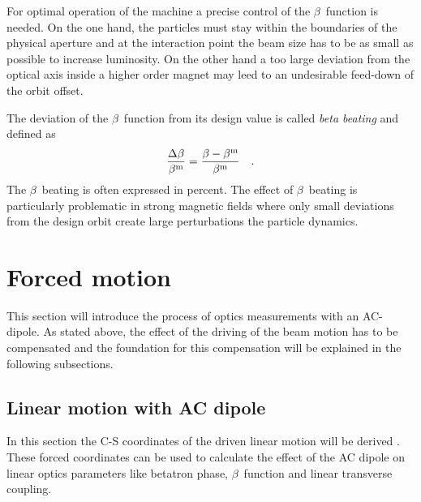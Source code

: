 For optimal operation of the machine a precise control of the $\beta$~function is needed. On the one
hand, the particles must stay within the boundaries of the physical aperture and 
at the interaction point the beam size has to be as small as possible to increase luminosity.
On the other hand a too large deviation from the optical axis inside a higher order magnet may leed to an undesirable
feed-down of the orbit offset.

The deviation of the $\beta$~function from its design value is called \emph{beta beating} and defined as 
%
\begin{equation}
    \frac{\Delta\beta}{\beta^\text{m}} = \frac{\beta - \beta^\text{m}}{\beta^\text{m}}
    \label{eq_def_beta_beat}
    \quad .
\end{equation}
%
The $\beta$~beating is often expressed in percent.
The effect of $\beta$~beating is particularly problematic in strong magnetic fields where only small
deviations from the design orbit create large perturbations the particle dynamics.

\section{Forced motion}

This section will introduce the process of optics measurements with an AC-dipole. As stated above,
the effect of the driving of the beam motion has to be compensated and the foundation for this
compensation will be explained in the following subsections.

\subsection{Linear motion with AC dipole}
\newcommand{\Qd}[1]{Q^{d}_{#1}}

In this section the C-S coordinates of the driven linear motion will be derived \cite{Miyamoto2010,Peggs1998}. These forced coordinates
can be used to calculate the effect of the AC dipole on linear optics parameters like betatron phase, 
$\beta$~function and linear transverse coupling.

